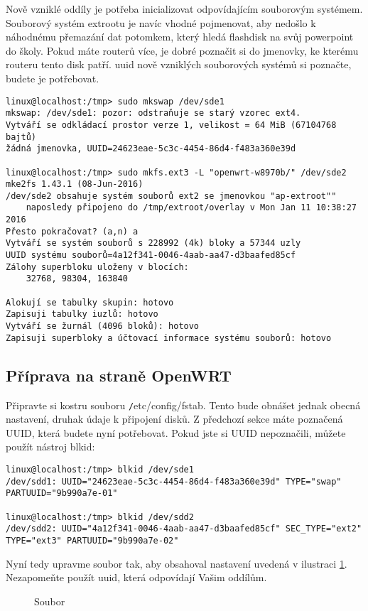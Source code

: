 Nově vzniklé oddíly je potřeba inicializovat odpovídajícím souborovým systémem.
Souborový systém extrootu je navíc vhodné pojmenovat, aby nedošlo k náhodnému
přemazání dat potomkem, který hledá flashdisk na svůj powerpoint do školy.
Pokud máte routerů více, je dobré poznačit si do jmenovky, ke kterému routeru
tento disk patří. \gls{uuid} nově vzniklých souborových systémů si poznačte,
budete je potřebovat.
\begin{verbatim}
linux@localhost:/tmp> sudo mkswap /dev/sde1
mkswap: /dev/sde1: pozor: odstraňuje se starý vzorec ext4.
Vytváří se odkládací prostor verze 1, velikost = 64 MiB (67104768 bajtů)
žádná jmenovka, UUID=24623eae-5c3c-4454-86d4-f483a360e39d

linux@localhost:/tmp> sudo mkfs.ext3 -L "openwrt-w8970b/" /dev/sde2
mke2fs 1.43.1 (08-Jun-2016)
/dev/sde2 obsahuje systém souborů ext2 se jmenovkou "ap-extroot""
	naposledy připojeno do /tmp/extroot/overlay v Mon Jan 11 10:38:27 2016
Přesto pokračovat? (a,n) a
Vytváří se systém souborů s 228992 (4k) bloky a 57344 uzly
UUID systému souborů=4a12f341-0046-4aab-aa47-d3baafed85cf
Zálohy superbloku uloženy v blocích:
	32768, 98304, 163840

Alokují se tabulky skupin: hotovo
Zapisuji tabulky iuzlů: hotovo
Vytváří se žurnál (4096 bloků): hotovo
Zapisuji superbloky a účtovací informace systému souborů: hotovo
\end{verbatim}

\subsection{Příprava na straně OpenWRT}
Připravte si kostru souboru {\texttt /etc/config/fstab}. Tento bude obnášet
jednak obecná nastavení, druhak údaje k připojení disků. Z předchozí sekce
máte poznačená UUID, která budete nyní potřebovat. Pokud jste si UUID
nepoznačili, můžete použít nástroj blkid:

\begin{verbatim}
linux@localhost:/tmp> blkid /dev/sde1
/dev/sdd1: UUID="24623eae-5c3c-4454-86d4-f483a360e39d" TYPE="swap" PARTUUID="9b990a7e-01"

linux@localhost:/tmp> blkid /dev/sdd2
/dev/sdd2: UUID="4a12f341-0046-4aab-aa47-d3baafed85cf" SEC_TYPE="ext2" TYPE="ext3" PARTUUID="9b990a7e-02"
\end{verbatim}

Nyní tedy upravme soubor  tak, aby obsahoval nastavení
uvedená v ilustraci \ref{extroot:fstab}. Nezapomeňte použít \gls{uuid}, která
odpovídají Vašim oddílům.
\begin{figure}
	
	\caption{Soubor }
	\label{extroot:fstab}
\end{figure}


